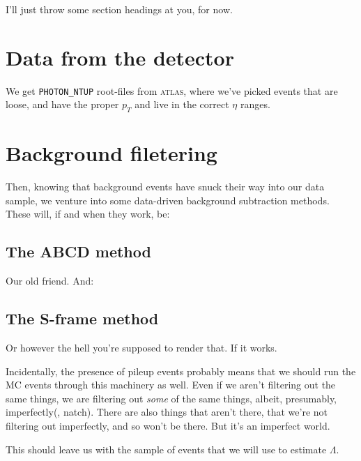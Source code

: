 I'll just throw some section headings at you, for now.

\section{Data from the detector}
We get \texttt{PHOTON\_NTUP} root-files from \textsc{atlas}, where we've picked events that are loose, and have the proper $p_T$ and live in the correct $\eta$ ranges.

\section{Background filetering}
Then, knowing that background events have snuck their way into our data sample, we venture into some data-driven background subtraction methods. These will, if and when they work, be:

\subsection{The ABCD method}
Our old friend. And:

\subsection{The S-frame method}
Or however the hell you're supposed to render that. If it works.

Incidentally, the presence of pileup events probably means that we should run the MC events through this machinery as well. Even if we aren't filtering out the same things, we are filtering out \textit{some} of the same things, albeit, presumably, imperfectly(, natch). There are also things that aren't there, that we're not filtering out imperfectly, and so won't be there. But it's an imperfect world.

This should leave us with the sample of events that we will use to estimate $\Lambda$.
